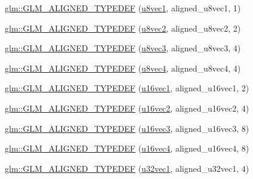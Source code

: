\begin{DoxyCompactItemize}
\item 
\mbox{\hyperlink{group__gtx__type__aligned_ga5611d6718e3a00096918a64192e73a45}{glm\+::\+G\+L\+M\+\_\+\+A\+L\+I\+G\+N\+E\+D\+\_\+\+T\+Y\+P\+E\+D\+EF}} (\mbox{\hyperlink{group__gtc__type__precision_ga5b0875b5979b80a0ccb371bf7f0f95d8}{u8vec1}}, aligned\+\_\+u8vec1, 1)
\item 
\mbox{\hyperlink{group__gtx__type__aligned_ga19837e6f72b60d994a805ef564c6c326}{glm\+::\+G\+L\+M\+\_\+\+A\+L\+I\+G\+N\+E\+D\+\_\+\+T\+Y\+P\+E\+D\+EF}} (\mbox{\hyperlink{group__gtc__type__precision_ga01e28d0272428f94d22ea6111f0112be}{u8vec2}}, aligned\+\_\+u8vec2, 2)
\item 
\mbox{\hyperlink{group__gtx__type__aligned_ga9740cf8e34f068049b42a2753f9601c2}{glm\+::\+G\+L\+M\+\_\+\+A\+L\+I\+G\+N\+E\+D\+\_\+\+T\+Y\+P\+E\+D\+EF}} (\mbox{\hyperlink{group__gtc__type__precision_gaa86b325e581afdc643495fbe428c1f1b}{u8vec3}}, aligned\+\_\+u8vec3, 4)
\item 
\mbox{\hyperlink{group__gtx__type__aligned_ga8b8588bb221448f5541a858903822a57}{glm\+::\+G\+L\+M\+\_\+\+A\+L\+I\+G\+N\+E\+D\+\_\+\+T\+Y\+P\+E\+D\+EF}} (\mbox{\hyperlink{group__gtc__type__precision_ga6c8841fa492bd5b1078b171452fd6974}{u8vec4}}, aligned\+\_\+u8vec4, 4)
\item 
\mbox{\hyperlink{group__gtx__type__aligned_ga991abe990c16de26b2129d6bc2f4c051}{glm\+::\+G\+L\+M\+\_\+\+A\+L\+I\+G\+N\+E\+D\+\_\+\+T\+Y\+P\+E\+D\+EF}} (\mbox{\hyperlink{group__gtc__type__precision_ga40d9e5ab8120f10efcfd7c88436c4a81}{u16vec1}}, aligned\+\_\+u16vec1, 2)
\item 
\mbox{\hyperlink{group__gtx__type__aligned_gac01bb9fc32a1cd76c2b80d030f71df4c}{glm\+::\+G\+L\+M\+\_\+\+A\+L\+I\+G\+N\+E\+D\+\_\+\+T\+Y\+P\+E\+D\+EF}} (\mbox{\hyperlink{group__gtc__type__precision_ga50bd2ceeb100a187e7c46f135269a0ec}{u16vec2}}, aligned\+\_\+u16vec2, 4)
\item 
\mbox{\hyperlink{group__gtx__type__aligned_ga09540dbca093793a36a8997e0d4bee77}{glm\+::\+G\+L\+M\+\_\+\+A\+L\+I\+G\+N\+E\+D\+\_\+\+T\+Y\+P\+E\+D\+EF}} (\mbox{\hyperlink{group__gtc__type__precision_gad60f14d1abd39b480cbe5c5cf848071a}{u16vec3}}, aligned\+\_\+u16vec3, 8)
\item 
\mbox{\hyperlink{group__gtx__type__aligned_gaecafb5996f5a44f57e34d29c8670741e}{glm\+::\+G\+L\+M\+\_\+\+A\+L\+I\+G\+N\+E\+D\+\_\+\+T\+Y\+P\+E\+D\+EF}} (\mbox{\hyperlink{group__gtc__type__precision_ga049d45ad8d0f78578d7ceb86a7fdaae4}{u16vec4}}, aligned\+\_\+u16vec4, 8)
\item 
\mbox{\hyperlink{group__gtx__type__aligned_gac6b161a04d2f8408fe1c9d857e8daac0}{glm\+::\+G\+L\+M\+\_\+\+A\+L\+I\+G\+N\+E\+D\+\_\+\+T\+Y\+P\+E\+D\+EF}} (\mbox{\hyperlink{group__gtc__type__precision_ga99f64714ce341e34036bd10c8b36823a}{u32vec1}}, aligned\+\_\+u32vec1, 4)

\end{DoxyCompactItemize}
